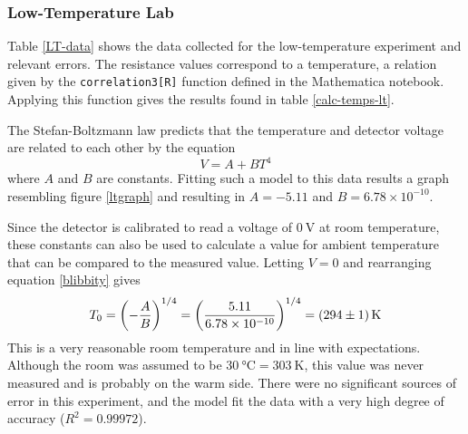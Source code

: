 \documentclass[%
 reprint,
superscriptaddress,
 amsmath,amssymb,
 aps,
]{revtex4-1}
\begin{document}
\subsubsection{Low-Temperature Lab}

Table \ref{LT-data} shows the data collected for the low-temperature experiment and relevant errors. The resistance values correspond to a temperature, a relation given by the \texttt{correlation3[R]} function defined in the Mathematica notebook. Applying this function gives the results found in table \ref{calc-temps-lt}.

The Stefan-Boltzmann law predicts that the temperature and detector voltage are related to each other by the equation
\begin{equation}\label{blibbity}
    V = A + BT^4
\end{equation}
where $A$ and $B$ are constants. Fitting such a model to this data results a graph resembling figure \ref{ltgraph} and resulting in $A = -5.11$ and $B = 6.78\times10^{-10}$.

Since the detector is calibrated to read a voltage of $\SI{0}{\volt}$ at room temperature, these constants can also be used to calculate a value for ambient temperature that can be compared to the measured value. Letting $V=0$ and rearranging equation \ref{blibbity} gives
\begin{equation*}
    T_0 = \left(-\frac{A}{B}\right)^{1/4} = \left(\frac{5.11}{6.78\times10^{-10}}\right)^{1/4} = \SI[separate-uncertainty = true]{294 (1)}{\kelvin}
\end{equation*}
This is a very reasonable room temperature and in line with expectations. Although the room was assumed to be $\SI{30}{\celsius} = \SI{303}{\kelvin}$, this value was never measured and is probably on the warm side. There were no significant sources of error in this experiment, and the model fit the data with a very high degree of accuracy ($R^2 = 0.99972$).
\end{document}
